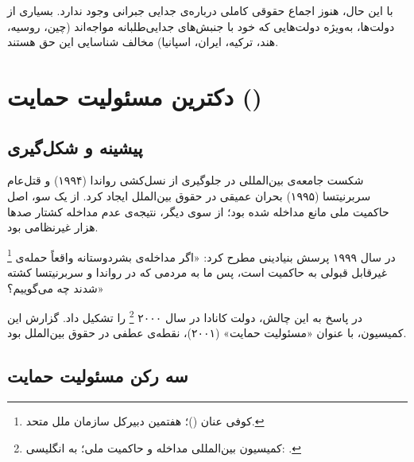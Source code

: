 با این حال، هنوز اجماع حقوقی کاملی درباره‌ی جدایی جبرانی وجود
ندارد. بسیاری از دولت‌ها، به‌ویژه دولت‌هایی که خود با جنبش‌های
جدایی‌طلبانه مواجه‌اند (چین، روسیه، هند، ترکیه، ایران، اسپانیا)
مخالف شناسایی این حق هستند.


\section{دکترین مسئولیت حمایت ()}
\label{sec:ch03-r2p}

\subsection{پیشینه و شکل‌گیری}
\label{subsec:ch03-r2p-history}

شکست جامعه‌ی بین‌المللی در جلوگیری از نسل‌کشی رواندا (۱۹۹۴) و
قتل‌عام سربرنیتسا (۱۹۹۵) بحران عمیقی در حقوق بین‌الملل ایجاد
کرد. از یک سو، اصل حاکمیت ملی مانع مداخله شده بود؛ از سوی دیگر،
نتیجه‌ی عدم مداخله کشتار صدها هزار غیرنظامی بود.

%
\footnote{%
	کوفی عنان ()؛%
	هفتمین دبیرکل سازمان ملل متحد.%
}%
در سال ۱۹۹۹ پرسش بنیادینی مطرح کرد: «اگر مداخله‌ی بشردوستانه
واقعاً حمله‌ی غیرقابل قبولی به حاکمیت است، پس ما به مردمی که
در رواندا و سربرنیتسا کشته شدند چه
می‌گوییم؟»

در پاسخ به این چالش، دولت کانادا در سال ۲۰۰۰
%
\footnote{کمیسیون بین‌المللی مداخله و حاکمیت ملی؛ به انگلیسی:
	.}%
را تشکیل داد. گزارش این کمیسیون، با عنوان
«مسئولیت حمایت» (۲۰۰۱)، نقطه‌ی
عطفی در حقوق بین‌الملل بود.

\subsection{سه رکن مسئولیت حمایت}
\label{subsec:ch03-r2p-pillars}

